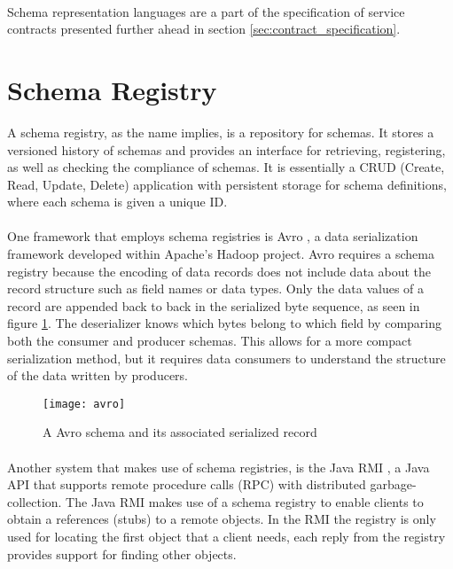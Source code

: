 \paragraph{}

Schema representation languages are a part of the specification of service contracts
presented further ahead in section \ref{sec:contract_specification}.

\section{Schema Registry} %
\label{sec:schema_registry}

A schema registry, as the name implies, is a repository for schemas.
It stores a versioned history of schemas and provides an interface for retrieving, registering, as well as checking the compliance of schemas.
It is essentially a CRUD (Create, Read, Update, Delete) application with persistent storage for schema definitions, where each schema is given a unique ID.

\paragraph{}

One framework that employs schema registries is Avro \cite{8}, a data serialization framework developed within Apache's Hadoop project.
Avro requires a schema registry because the encoding of data records does not include data about the record structure such as field names or data types.
Only the data values of a record are appended back to back in the serialized byte sequence, as seen in figure \ref{fig:avro}.
The deserializer knows which bytes belong to which field by comparing both the consumer and producer schemas.
This allows for a more compact serialization method, but it requires data consumers to understand the structure of the data written by producers.

\begin{figure}[htbp]
    \centering
    \texttt{[image: avro]}
    \caption{A Avro schema and its associated serialized record }
    \label{fig:avro}
\end{figure}

\paragraph{}

Another system that makes use of schema registries, is the Java RMI \cite{12},
a Java API that supports remote procedure calls (RPC) with distributed garbage-collection.
The Java RMI makes use of a schema registry to enable clients to obtain a references (stubs) to a remote objects.
In the RMI the registry is only used for locating the first object that a client needs, each reply from the registry provides
support for finding other objects.

